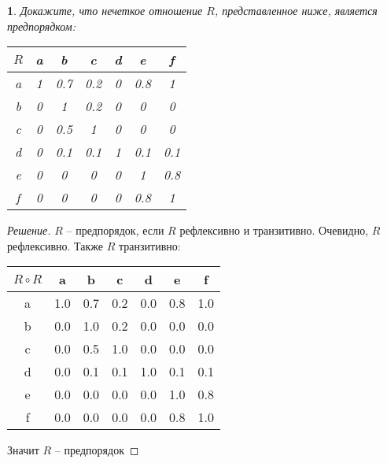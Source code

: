 \documentclass[11pt,a4paper,oneside]{article}
\newenvironment{problem}{
	\medskip
	\begin{problem-internal}
	}{
	\end{problem-internal}
}
\newenvironment{solution}{
	\begin{proof}[Решение]
		\vspace{-8px}
		\setlength{\parskip}{4px}
		\setlength{\parindent}{0px}
	}{
	\end{proof}
}
\newtheorem{problem-internal}{}
\newcommand{\+}{$\boldsymbol{+}$}
\begin{document}
	\begin{problem}
		Докажите, что нечеткое отношение $R$, представленное ниже, является предпорядком:
		\begin{table}[!hbtp]
			\centering
			\begin{tabular}{|c|c|c|c|c|c|c|}
				\hline
				$R$ & a & b   & c   & d & e   & f   \\ \hline
				a   & 1 & 0.7 & 0.2 & 0 & 0.8 & 1   \\ \hline
				b   & 0 & 1   & 0.2 & 0 & 0   & 0   \\ \hline
				c   & 0 & 0.5 & 1   & 0 & 0   & 0   \\ \hline
				d   & 0 & 0.1 & 0.1 & 1 & 0.1 & 0.1 \\ \hline
				e   & 0 & 0   & 0   & 0 & 1   & 0.8 \\ \hline
				f   & 0 & 0   & 0   & 0 & 0.8 & 1   \\ \hline
			\end{tabular}
		\end{table}
	\end{problem}
	\begin{solution}
		$R$ -- предпорядок, если $R$ рефлексивно и транзитивно. Очевидно, $R$ рефлексивно. Также $R$ транзитивно:
		\begin{table}[!hbtp]
			\centering
			\begin{tabular}{|c|c|c|c|c|c|c|}
				\hline
				$R \circ R$ & a  & b   & c   & d   & e   & f   \\ \hline
				 a  		&1.0 & 0.7 & 0.2 & 0.0 & 0.8 & 1.0 \\  \hline
				 b  		&0.0 & 1.0 & 0.2 & 0.0 & 0.0 & 0.0 \\  \hline
				 c  		&0.0 & 0.5 & 1.0 & 0.0 & 0.0 & 0.0 \\  \hline
				 d  		&0.0 & 0.1 & 0.1 & 1.0 & 0.1 & 0.1 \\ \hline
				 e  		&0.0 & 0.0 & 0.0 & 0.0 & 1.0 & 0.8 \\ \hline
				 f  		&0.0 & 0.0 & 0.0 & 0.0 & 0.8 & 1.0 \\ \hline
			\end{tabular}
		\end{table}
		
		Значит $R$ -- предпорядок
	\end{solution}
	\newpage
\end{document}
